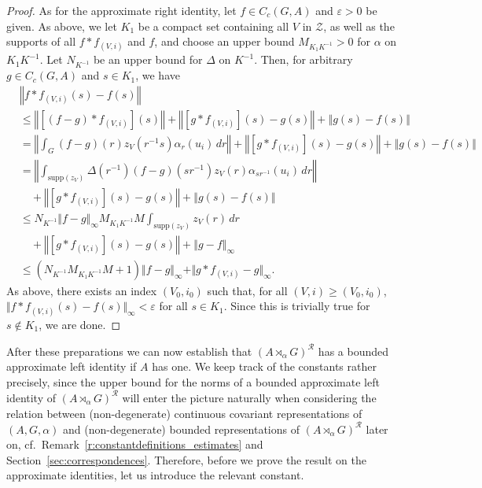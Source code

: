 \documentclass{amsart}
\theoremstyle{plain}
\theoremstyle{definition}
\numberwithin{equation}{section}
\begin{document}
\begin{proof}
As for the approximate right identity, let $f\in C_c(G,A)$ and ${\varepsilon}>0$ be given. As above, we let $K_1$ be a compact set containing all $V$ in $\mathcal Z$, as well as the supports of all $f*f_{(V,i)}$ and $f$, and choose an upper bound $M_{K_1 K^{-1}}>0$ for $\alpha$ on $K_1 K^{-1}$. Let $N_{K^{-1}}$ be an upper bound for $\Delta$ on $K^{-1}$. Then, for arbitrary $g\in C_c(G,A)$ and $s\in K_1$, we have
\begin{align*}
&{\left\Vert {f * f_{(V,i)}(s)-f(s)} \right\Vert}\\
&\leq {\left\Vert {[(f-g)*f_{(V,i)}](s)} \right\Vert} + {\left\Vert {[g*f_{(V,i)}](s)-g(s)} \right\Vert} + {\left\Vert {g(s)-f(s)} \right\Vert}\\
&={\left\Vert {\int_G  (f-g)(r) z_V(r^{-1}s)\alpha_r(u_i)\,dr} \right\Vert} + {\left\Vert {[g*f_{(V,i)}](s)-g(s)} \right\Vert} + {\left\Vert {g(s)-f(s)} \right\Vert}\\
&={\left\Vert {\int_{{\text{supp}}(z_V)} \Delta(r^{-1})(f-g)(sr^{-1}) z_V(r)\alpha_{sr^{-1}}(u_i)\,dr} \right\Vert} \\
&\quad + {\left\Vert {[g*f_{(V,i)}](s)-g(s)} \right\Vert} + {\left\Vert {g(s)-f(s)} \right\Vert}\\
&\leq N_{K^{-1}} \Vert f-g\Vert_\infty M_{K_1K^{-1}}M\int_{{\text{supp}}(z_V)} z_V(r)\,dr  \\
&\quad+ {\left\Vert {[g*f_{(V,i)}](s)-g(s)} \right\Vert} + {\left\Vert {g - f} \right\Vert}_\infty \\
&\leq(N_{K^{-1}} M_{K_1K^{-1}}M + 1) \Vert f-g\Vert_\infty + \Vert g*f_{(V,i)}-g\Vert_\infty.
\end{align*}
As above, there exists an index $(V_0,i_0)$ such that, for all $(V,i)\geq (V_0,i_0)$, $\Vert f * f_{(V,i)}(s) - f(s)\Vert_\infty < {\varepsilon}$ for all $s\in K_1$. Since this is trivially true for $s\notin K_1$, we are done.
\end{proof}

After these preparations we can now establish that ${(A {\rtimes}_\alpha G)^\mathcal{R}}$ has a bounded approximate left identity if $A$ has one. We keep track of the constants rather precisely, since the upper bound for the norms of a bounded approximate left identity of ${(A {\rtimes}_\alpha G)^\mathcal{R}}$ will enter the picture naturally when considering the relation between (non-degenerate) continuous covariant representations of ${(A,G,\alpha)}$ and (non-degenerate) bounded representations of ${(A {\rtimes}_\alpha G)^\mathcal{R}}$ later on, cf.\ Remark~\ref{r:constantdefinitions_estimates} and Section~\ref{sec:correspondences}. Therefore, before we prove the result on the approximate identities, let us introduce the relevant constant.
\end{document}
